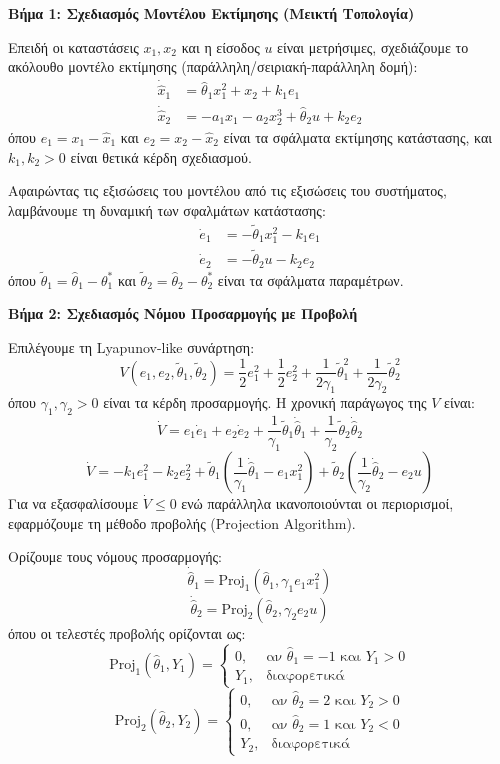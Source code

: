 \documentclass[a4paper,11pt]{article}
\begin{document}
\begin{answer}
\textbf{Βήμα 1: Σχεδιασμός Μοντέλου Εκτίμησης (Μεικτή Τοπολογία)}

Επειδή οι καταστάσεις $x_1, x_2$ και η είσοδος $u$ είναι μετρήσιμες, σχεδιάζουμε το ακόλουθο μοντέλο εκτίμησης (παράλληλη/σειριακή-παράλληλη δομή):
\begin{align}
    \dot{\hat{x}}_1 &= \hat{\theta}_1 x_1^2 + x_2 + k_1 e_1 \\
    \dot{\hat{x}}_2 &= -a_1 x_1 - a_2 x_2^3 + \hat{\theta}_2 u + k_2 e_2
\end{align}
όπου $e_1 = x_1 - \hat{x}_1$ και $e_2 = x_2 - \hat{x}_2$ είναι τα σφάλματα εκτίμησης κατάστασης, και $k_1, k_2 > 0$ είναι θετικά κέρδη σχεδιασμού.

Αφαιρώντας τις εξισώσεις του μοντέλου από τις εξισώσεις του συστήματος, λαμβάνουμε τη δυναμική των σφαλμάτων κατάστασης:
\begin{align}
    \dot{e}_1 &= -\tilde{\theta}_1 x_1^2 - k_1 e_1 \\
    \dot{e}_2 &= -\tilde{\theta}_2 u - k_2 e_2
\end{align}
όπου $\tilde{\theta}_1 = \hat{\theta}_1 - \theta_1^*$ και $\tilde{\theta}_2 = \hat{\theta}_2 - \theta_2^*$ είναι τα σφάλματα παραμέτρων.

\textbf{Βήμα 2: Σχεδιασμός Νόμου Προσαρμογής με Προβολή}

Επιλέγουμε τη Lyapunov-like συνάρτηση:
\[ V(e_1, e_2, \tilde{\theta}_1, \tilde{\theta}_2) = \frac{1}{2} e_1^2 + \frac{1}{2} e_2^2 + \frac{1}{2\gamma_1} \tilde{\theta}_1^2 + \frac{1}{2\gamma_2} \tilde{\theta}_2^2 \]
όπου $\gamma_1, \gamma_2 > 0$ είναι τα κέρδη προσαρμογής. Η χρονική παράγωγος της $V$ είναι:
\[ \dot{V} = e_1 \dot{e}_1 + e_2 \dot{e}_2 + \frac{1}{\gamma_1} \tilde{\theta}_1 \dot{\hat{\theta}}_1 + \frac{1}{\gamma_2} \tilde{\theta}_2 \dot{\hat{\theta}}_2 \]
\[ \dot{V} = -k_1 e_1^2 - k_2 e_2^2 + \tilde{\theta}_1 \left( \frac{1}{\gamma_1} \dot{\hat{\theta}}_1 - e_1 x_1^2 \right) + \tilde{\theta}_2 \left( \frac{1}{\gamma_2} \dot{\hat{\theta}}_2 - e_2 u \right) \]
Για να εξασφαλίσουμε $\dot{V} \le 0$ ενώ παράλληλα ικανοποιούνται οι περιορισμοί, εφαρμόζουμε τη μέθοδο προβολής (Projection Algorithm).

Ορίζουμε τους νόμους προσαρμογής:
\[ \dot{\hat{\theta}}_1 = \text{Proj}_1\left(\hat{\theta}_1, \gamma_1 e_1 x_1^2\right) \]
\[ \dot{\hat{\theta}}_2 = \text{Proj}_2\left(\hat{\theta}_2, \gamma_2 e_2 u\right) \]
όπου οι τελεστές προβολής ορίζονται ως:
\[ \text{Proj}_1\left(\hat{\theta}_1, Y_1\right) = \begin{cases} 
0, & \text{αν } \hat{\theta}_1 = -1 \text{ και } Y_1 > 0 \\
Y_1, & \text{διαφορετικά}
\end{cases} \]
\[ \text{Proj}_2\left(\hat{\theta}_2, Y_2\right) = \begin{cases} 
0, & \text{αν } \hat{\theta}_2 = 2 \text{ και } Y_2 > 0 \\
0, & \text{αν } \hat{\theta}_2 = 1 \text{ και } Y_2 < 0 \\
Y_2, & \text{διαφορετικά}
\end{cases} \]


\end{answer}
\end{document}
